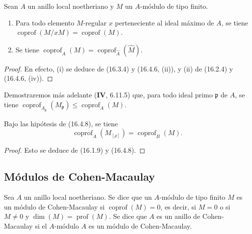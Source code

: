 \begin{proposition}[16.4.10]
\label{0.16.4.10-fr}
Sean $A$ un anillo local noetheriano y $M$ un $A$-módulo de tipo finito.
\begin{enumerate}
  \item[\textup{(i)}] Para todo elemento $M$-regular $x$ perteneciente al ideal máximo
  de $A$, se tiene
  $\operatorname{coprof}(M/xM)=\operatorname{coprof}(M)$.
  \item[\textup{(ii)}] Se tiene
  $\operatorname{coprof}_A(M)=\operatorname{coprof}_{\widehat A}(\widehat M)$.
\end{enumerate}
\end{proposition}

\begin{proof}
En efecto, (i) se deduce de (16.3.4) y (16.4.6, (ii)), y (ii) de (16.2.4) y
(16.4.6, (iv)).
\end{proof}

Demostraremos más adelante (\textbf{IV}, 6.11.5) que, para todo ideal primo
$\mathfrak{p}$ de $A$, se tiene
$\operatorname{coprof}_{A_{\mathfrak{p}}}(M_{\mathfrak{p}})
\leq\operatorname{coprof}_A(M)$.

\begin{proposition}[16.4.11]
\label{0.16.4.11-fr}
Bajo las hipótesis de \textup{(16.4.8)}, se tiene
\begin{equation}
\label{0.16.4.11.1-fr}
\tag{16.4.11.1}
  \operatorname{coprof}_A(M_{[\rho]})=\operatorname{coprof}_B(M).
\end{equation}
\end{proposition}

\begin{proof}
Esto se deduce de (16.1.9) y (16.4.8).
\end{proof}

\subsection{Módulos de Cohen-Macaulay}
\label{subsection:0.16.5-fr}

\begin{definition}[16.5.1]
\label{0.16.5.1-fr}
Sea $A$ un anillo local noetheriano. Se dice que un $A$-módulo de tipo finito
$M$ es un módulo de Cohen-Macaulay si
$\operatorname{coprof}(M)=0$, es decir, si $M=0$ o si $M\neq0$ y
$\dim(M)=\operatorname{prof}(M)$. Se dice que $A$ es un
anillo de Cohen-Macaulay si el $A$-módulo $A$ es un módulo de
Cohen-Macaulay.
\end{definition}

